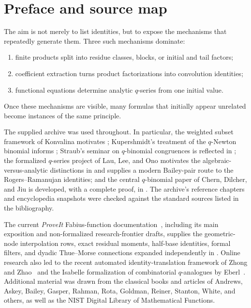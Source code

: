 \documentclass[11pt,oneside,openany]{book}
\theoremstyle{definition}
\theoremstyle{remark}
\begin{document}
\chapter*{Preface and source map}
The aim is not merely to list identities, but to expose the mechanisms that repeatedly generate them.  Three such mechanisms dominate:
\begin{enumerate}
\item finite products split into residue classes, blocks, or initial and tail factors;
\item coefficient extraction turns product factorizations into convolution identities;
\item functional equations determine analytic $q$-series from one initial value.
\end{enumerate}
Once these mechanisms are visible, many formulas that initially appear unrelated become instances of the same principle.

The supplied archive was used throughout.  In particular, the weighted subset framework of Konvalina motivates ; Kupershmidt's treatment of the $q$-Newton binomial informs ; Straub's seminar on $q$-binomial congruences is reflected in ; the formalized $q$-series project of Lau, Lee, and Ono motivates the algebraic-versus-analytic distinctions in  and supplies a modern Bailey-pair route to the Rogers--Ramanujan identities; and the central $q$-binomial paper of Chern, Dilcher, and Jiu is developed, with a complete proof, in .  The archive's reference chapters and encyclopedia snapshots were checked against the standard sources listed in the bibliography.

The current \emph{ProveIt} Fabius-function documentation~\cite{ReshetnikovProveIt2026}, including its main exposition and non-formalized research-frontier drafts, supplies the geometric-node interpolation rows, exact residual moments, half-base identities, formal filters, and dyadic Thue--Morse connections expanded independently in .  Online research also led to the recent automated identity-translation framework of Zhong and Zhao~\cite{ZhongZhao2026} and the Isabelle formalization of combinatorial $q$-analogues by Eberl~\cite{Eberl2024QAnalogues}.  Additional material was drawn from the classical books and articles of Andrews, Askey, Bailey, Gasper, Rahman, Rota, Goldman, Reiner, Stanton, White, and others, as well as the NIST Digital Library of Mathematical Functions.
\end{document}
